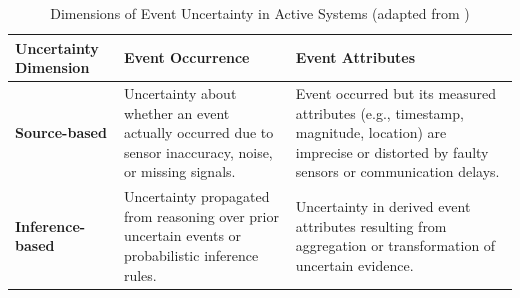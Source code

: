
\begin{table}[H]
\centering
\caption{Dimensions of Event Uncertainty in Active Systems (adapted from \citet{wasserkrug2006taxonomy})}
\label{tab:uncertainty-dimensions}
\begin{tabular}{|p{3cm}|p{5.5cm}|p{5.5cm}|}
\hline
\textbf{Uncertainty Dimension} & \textbf{Event Occurrence} & \textbf{Event Attributes} \\
\hline
\textbf{Source-based} &
Uncertainty about whether an event actually occurred due to sensor inaccuracy, noise, or missing signals. &
Event occurred but its measured attributes (e.g., timestamp, magnitude, location) are imprecise or distorted by faulty sensors or communication delays. \\
\hline
\textbf{Inference-based} &
Uncertainty propagated from reasoning over prior uncertain events or probabilistic inference rules. &
Uncertainty in derived event attributes resulting from aggregation or transformation of uncertain evidence. \\
\hline
\end{tabular}
\end{table}